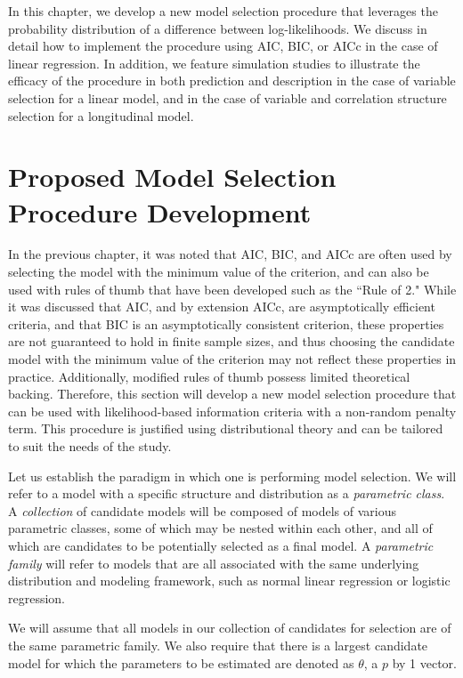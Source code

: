 \doublespace		
{}
		In this chapter, we develop a new model selection procedure that leverages the probability distribution of a difference between log-likelihoods. We discuss in detail how
		to implement the procedure using AIC, BIC, or AICc in the case of linear regression.  In addition, we feature simulation studies to illustrate the efficacy of the procedure
		in both prediction and description in the case of variable selection for a linear model, and in the case of variable and correlation structure selection for a longitudinal model.

		\section{Proposed Model Selection Procedure Development} \label{sec:proposed_method}
		In the previous chapter, it was noted that AIC, BIC, and AICc are often used by selecting the model with the minimum value of the criterion, and can also be used with
		rules of thumb that have been developed such as the ``Rule of 2." While it was discussed that AIC, and by extension AICc, are asymptotically efficient criteria,
		and that BIC is an asymptotically consistent criterion, these properties are not guaranteed to hold in finite sample sizes, and thus choosing the candidate model with
		the minimum value of the criterion may not reflect these properties in practice. Additionally, modified rules of thumb possess limited theoretical backing. Therefore,
		this section will develop a new model selection procedure that can be used with likelihood-based information criteria with a non-random penalty term. This procedure is justified
		using distributional theory and can be tailored to suit the needs of the study.
		
		Let us establish the paradigm in which one is performing model selection. We will refer to a model with a specific structure and distribution as a \textit{parametric class}.
		A \textit{collection} of candidate models will be composed of models of various parametric classes, some of which may be nested within each other, and all of which are candidates
		to be potentially selected as a final model. A \textit{parametric family} will refer to models that are all associated with the same underlying distribution and modeling framework, such as normal linear
		regression or logistic regression.
		
		We will assume that all models in our collection of candidates for selection are of the same parametric family. We also require that there is a largest candidate model
		for which the parameters to be estimated are denoted as $\theta$, a $p$ by 1 vector.

